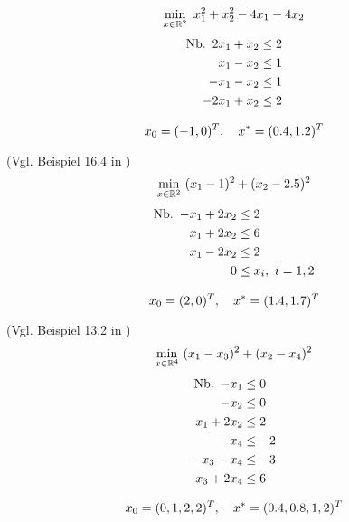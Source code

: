 \begin{testproblem}
\begin{equation}
\min_{x\in\mathbb{R}^2}\ x_1^2 + x_2^2 - 4 x_1 - 4 x_2
\end{equation}
\begin{equation*}
\begin{split}
\nb 2 x_1 + x_2 & \leq 2 \\
x_1 - x_2 & \leq 1 \\
-x_1 - x_2 & \leq 1 \\
-2 x_1 + x_2 & \leq 2 \\
\end{split}
\end{equation*}

\begin{equation*}
x_0 = (-1, 0)^T,\quad x^* = (0.4, 1.2)^T
\end{equation*}
\end{testproblem}

\begin{testproblem}
(Vgl. Beispiel 16.4 in \cite[S.~475]{nocedal})
\begin{equation}
\min_{x\in\mathbb{R}^2}\ (x_1 - 1)^2 + (x_2 - 2.5)^2
\end{equation}
\begin{equation*}
\begin{split}
\nb -x_1 + 2 x_2 & \leq 2 \\
x_1 + 2 x_2 & \leq 6 \\
x_1 - 2 x_2 & \leq 2 \\
0 & \leq x_i,\ i = 1,2 \\
\end{split}
\end{equation*}

\begin{equation*}
x_0 = (2, 0)^T,\quad x^* = (1.4, 1.7)^T
\end{equation*}
\end{testproblem}

\begin{testproblem}
(Vgl. Beispiel 13.2 in \cite[S.~415f]{antoniou})
\begin{equation}
\min_{x\in\mathbb{R}^4}\ (x_1 - x_3)^2 + (x_2 - x_4)^2
\end{equation}
\begin{equation*}
\begin{split}
\nb -x_1 & \leq 0 \\
-x_2 & \leq 0 \\
x_1 + 2 x_2 & \leq 2 \\
-x_4 & \leq -2 \\
-x_3 - x_4 & \leq -3 \\
x_3 + 2 x_4 & \leq 6 \\
\end{split}
\end{equation*}

\begin{equation*}
x_0 = (0, 1, 2, 2)^T,\quad x^* = (0.4, 0.8, 1, 2)^T
\end{equation*}
\end{testproblem}

